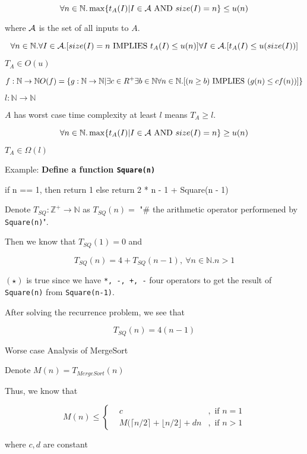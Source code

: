\documentclass[
]{article}
\newenvironment{Shaded}{}{}
\newcommand{\NormalTok}[1]{#1}
\newcommand{\ali}[1]{\begin{align}#1\end{align}}
\def\N {{\mathbb N}}
\def\Z {{\mathbb Z}}
\newcommand{\Implies}{\mbox{ IMPLIES }}
\renewcommand{\And}{\mbox{ AND }}
\newcommand{\floor}[1]{\lfloor#1\rfloor}
\newcommand{\ceil}[1]{\lceil#1\rceil}
\renewcommand{\N}{\mathbb{N}}
\begin{document}
\[\forall n\in \N.\max\{t_A(I)|I \in \A \And size(I)=n \}\leq u(n)\\\]

where \(\mathcal{A}\) is the set of all inputs to \(A\).

\[\forall n\in\N. \forall I \in \A. [size(I) = n \Implies t_A(I)\leq u(n)]\\
\forall I \in \A. [t_A(I)\leq u(size(I))]\]

\(T_A\in O(u)\)

\[f:\N\to\N\\
O(f) = \{g:\N\to\N|\exists c\in R^+\exists b\in \N\forall n \in \N. [(n\geq b)\Implies (g(n)\leq cf(n))] \}\]

\(l: \N\to\N\)

\(A\) has worst case time complexity at least \(l\) means
\(T_A \geq l\).

\[\forall n\in \N.\max\{t_A(I)|I \in \A \And size(I)=n \}\geq u(n)\]

\(T_A\in \Omega(l)\)

Example: \textbf{Define a function \texttt{Square(n)}}

\begin{Shaded}
\begin{Highlighting}[]
\NormalTok{if n == 1, then return 1}
\NormalTok{else return 2 * n {-} 1 + Square(n {-} 1)}
\end{Highlighting}
\end{Shaded}

Denote \(T_{SQ}: \Z^+ \to \N\) as \(T_{SQ}(n) = \) "\# the arithmetic
operator performened by \texttt{Square(n)}".

Then we know that \(T_{SQ}(1) = 0\) and

\[T_{SQ}(n) = 4 + T_{SQ}(n-1), \ \forall n \in \N. n> 1\tag{$\star$}\]

\((\star)\) is true since we have \texttt{*,\ -,\ +,\ -} four operators
to get the result of \texttt{Square(n)} from \texttt{Square(n-1)}.

After solving the recurrence problem, we see that

\[T_{SQ}(n) = 4(n-1)\]

Worse case Analysis of MergeSort

Denote \(M(n) = T_{MergeSort}(n)\)

Thus, we know that

\[M(n) \leq \left\{
\ali{&c &,\mbox{ if } n = 1\\
&M(\ceil{n/2} + \floor{n/2}+ dn&,\mbox{ if } n > 1 }
\right.\]

where \(c, d\) are constant
\end{document}
